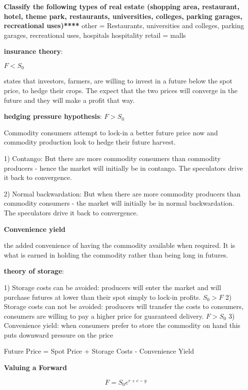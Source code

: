 \documentclass[12pt]{article}
\begin{document}
\begin{framed}
\textbf{Classify the following types of real estate (shopping area, restaurant,  hotel,  theme park, restaurants, universities, colleges, parking garages, recreational uses)****}
other = Restaurants, universities and colleges, parking garages, recreational uses, hospitals
hospitality
retail = malls

	
\begin{framed}
	
	\textbf{insurance theory}: 
	
	$F < S_0$
	
	states that investors, farmers, are willing to invest in a future below the spot price, to hedge their crops. The expect that the two prices will converge in the future and they will make a profit that way.
	
	\textbf{hedging pressure hypothesis}: 
	$F > S_0$
	
	Commodity consumers attempt to lock-in a better future price now and commodity production look to hedge their future harvest.
	
	1) Contango: But there are more commodity consumers than commodity producers - hence the market will initially be in contango. The speculators drive it back to convergence. 
	
	2) Normal backwardation:  But when there are more commodity producers than commodity consumers -  the market will initially be in normal backwardation. The speculators drive it back to convergence. 
	
	\textbf{Convenience yield} 
	
	the added convenience of having the commodity available when required. It is what is earned in holding the commodity rather than being long in futures. 
		
	\textbf{theory of storage}:
	
	1) Storage costs can be avoided: producers will enter the market and will purchase futures at lower than their spot simply to lock-in profits. $S_0 > F$
	2) Storage costs can not be avoided: producers will transfer the costs to consumers, consumers are willing to pay a higher price for guaranteed delivery. $F > S_0$
	3) Convenience yield: when consumers prefer to store the commodity on hand this puts downward pressure on the price
	
	Future Price = Spot Price + Storage Costs - Convenience Yield
	
	\textbf{Valuing a Forward}
	
	$$
	F = S_0 e^{r + c - y}
	$$
	

\end{framed}
\end{framed}
\end{document}
